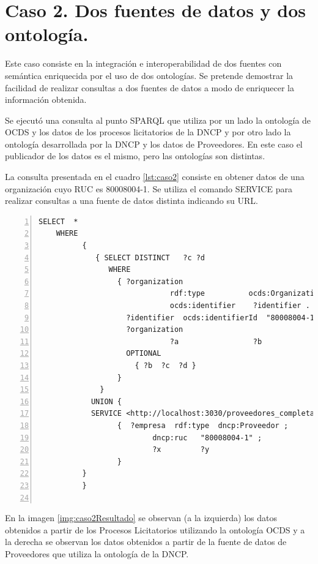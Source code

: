 \section{Caso 2. Dos fuentes de datos y dos ontología.}


Este caso consiste en la integración e interoperabilidad de dos fuentes con semántica enriquecida por el uso de dos ontologías. Se pretende demostrar la facilidad de realizar consultas a dos fuentes de datos a modo de enriquecer la información obtenida.

Se ejecutó una consulta al punto SPARQL que utiliza por un lado la ontología de OCDS y los datos de los procesos licitatorios de la DNCP y por otro lado la ontología desarrollada por la DNCP y los datos de Proveedores. En este caso el publicador de los datos es el mismo, pero las ontologías son distintas.

La consulta presentada en el cuadro \ref{lst:caso2} consiste en obtener datos de una organización cuyo RUC es 80008004-1. Se utiliza el comando SERVICE para realizar consultas a una fuente de datos distinta indicando su URL.

\noindent\begin{minipage}{\textwidth}
\begin{lstlisting}[captionpos=b, caption={Consulta a dos fuentes de de datos}, label={lst:caso2},  numbers=left,  numberstyle=\tiny\color{mygray},
    basicstyle=\tiny,frame=single]
SELECT  *
    WHERE
          {   
             { SELECT DISTINCT   ?c ?d
                WHERE
                  { ?organization
                              rdf:type          ocds:Organization ;
                              ocds:identifier    ?identifier .
                    ?identifier  ocds:identifierId  "80008004-1" .
                    ?organization
                              ?a                 ?b
                    OPTIONAL
                      { ?b  ?c  ?d }
                  }
              }
            UNION {
            SERVICE <http://localhost:3030/proveedores_completas_no_inf/sparql>
                  {  ?empresa  rdf:type  dncp:Proveedor ;
                          dncp:ruc   "80008004-1" ;
                          ?x         ?y
                  }
          }
          }
    
 \end{lstlisting}
\end{minipage}

 En la imagen \ref{img:caso2Resultado} se observan (a la izquierda) los datos obtenidos a partir de los Procesos Licitatorios utilizando la ontología OCDS y a la derecha se observan los datos obtenidos a partir de la fuente de datos de Proveedores que utiliza la ontología de la DNCP.


